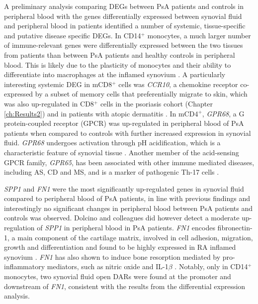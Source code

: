 A preliminary analysis comparing DEGs between PsA patients and controls in peripheral blood with the genes differentially expressed between synovial fluid and peripheral blood in patients identified a number of systemic, tissue-specific and putative disease specific DEGs. In CD14$^+$ monocytes, a much larger number of immune-relevant genes were differentially expressed between the two tissues from patients than between PsA patients and healthy controls in peripheral blood. This is likely due to the plasticity of monocytes and their ability to differentiate into macrophages at the inflamed synovium \parencite{Yoon2014, Park2016}. A particularly interesting systemic DEG in mCD8$^+$ cells was \textit{CCR10}, a chemokine receptor co-expressed by a subset of memory cells that preferentially migrate to skin, which was also up-regulated in CD8$^+$ cells in the psoriasis cohort (Chapter \ref{ch:Results2}) and in patients with atopic dermatitis \parencite{Hijnen2005}. In mCD4$^+$, \textit{GPR68}, a G protein-coupled receptor (GPCR) was up-regulated in peripheral blood of PsA patients when compared to controls with further increased expression in synovial fluid. \textit{GPR68} undergoes activation through pH acidification, which is a characteristic feature of synovial tissue \parencite{Biniecka2016, Saxena2012}. Another member of the acid-sensing GPCR family, \textit{GPR65}, has been associated with other immune mediated diseases, including AS, CD and MS, and is a marker of pathogenic Th-17 cells \parencite{Cortes2013,Lassen2016,Wirasinha2018,Gaublomme2015, Al-Mossawi2017}. 

\textit{SPP1} and \textit{FN1} were the most significantly up-regulated genes in synovial fluid compared to peripheral blood of PsA patients, in line with previous findings \parencite{Dolcino2015} and interestingly no significant changes in peripheral blood between PsA patients and controls was observed. Dolcino and colleagues did however detect a moderate up-regulation of \textit{SPP1} in peripheral blood in PsA patients. \textit{FN1} encodes fibronectin-1, a main component of the cartilage matrix, involved in cell adhesion, migration, growth and differentiation and found to be highly expressed in RA inflamed synovium \parencite{Chang2005}. \textit{FN1} has also shown to induce bone resorption mediated by pro-inflammatory mediators, such as nitric oxide and IL-1$\beta$ \parencite{Gramoun2010}. Notably, only in CD14$^+$ monocytes, two synovial fluid open DARs were found at the promoter and downstream of \textit{FN1}, consistent with the results from the differential expression analysis. 

